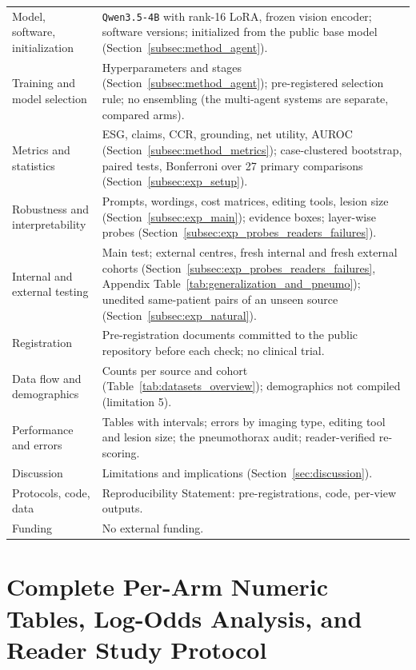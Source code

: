 \documentclass[5p,times,twocolumn,authoryear]{elsarticle}
\begin{document}
\begin{table}[!htbp]
\begin{center}
\begin{adjustbox}{max width=\linewidth}
\begin{tabular}{L{3.6cm}L{9.6cm}}
Model, software, initialization & \texttt{Qwen3.5-4B} with rank-16 LoRA, frozen vision encoder; software versions; initialized from the public base model (Section~\ref{subsec:method_agent}). \\
Training and model selection & Hyperparameters and stages (Section~\ref{subsec:method_agent}); pre-registered selection rule; no ensembling (the multi-agent systems are separate, compared arms). \\
Metrics and statistics & ESG, claims, CCR, grounding, net utility, AUROC (Section~\ref{subsec:method_metrics}); case-clustered bootstrap, paired tests, Bonferroni over 27 primary comparisons (Section~\ref{subsec:exp_setup}). \\
Robustness and interpretability & Prompts, wordings, cost matrices, editing tools, lesion size (Section~\ref{subsec:exp_main}); evidence boxes; layer-wise probes (Section~\ref{subsec:exp_probes_readers_failures}). \\
Internal and external testing & Main test; external centres, fresh internal and fresh external cohorts (Section~\ref{subsec:exp_probes_readers_failures}, Appendix Table~\ref{tab:generalization_and_pneumo}); unedited same-patient pairs of an unseen source (Section~\ref{subsec:exp_natural}). \\
Registration & Pre-registration documents committed to the public repository before each check; no clinical trial. \\
Data flow and demographics & Counts per source and cohort (Table~\ref{tab:datasets_overview}); demographics not compiled (limitation 5). \\
Performance and errors & Tables with intervals; errors by imaging type, editing tool and lesion size; the pneumothorax audit; reader-verified re-scoring. \\
Discussion & Limitations and implications (Section~\ref{sec:discussion}). \\
Protocols, code, data & Reproducibility Statement: pre-registrations, code, per-view outputs. \\
Funding & No external funding. \\
\bottomrule
\end{tabular}
\end{adjustbox}
\end{center}
\end{table}

\section{Complete Per-Arm Numeric Tables, Log-Odds Analysis, and Reader Study Protocol}
\label{app:detailed_tables}
\end{document}
